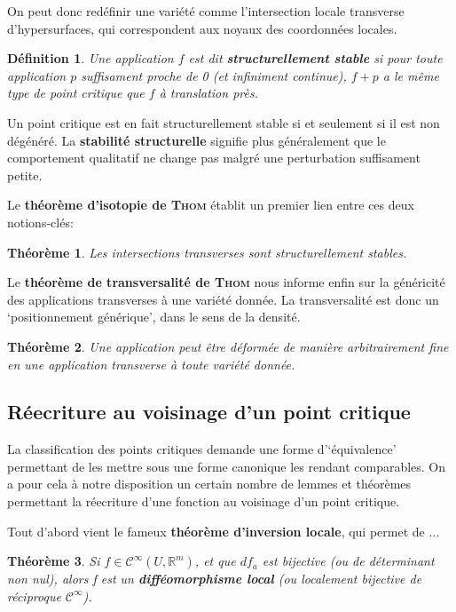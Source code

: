 \documentclass{article}
\newtheorem{defn}{Définition}
\newtheorem{thm}{Théorème}
\begin{document}
On peut donc redéfinir une variété comme l'intersection locale transverse d'hypersurfaces, qui correspondent aux noyaux des coordonnées locales.

\begin{defn}
Une application $f$ est dit \textbf{structurellement stable} si pour toute application $p$ suffisament proche de 0 (et infiniment continue), $f+p$ a le même type de point critique que $f$ à translation près.
\end{defn}

Un point critique est en fait structurellement stable si et seulement si il est non dégénéré.
La \textbf{stabilité structurelle} signifie plus généralement que le comportement qualitatif ne change pas malgré une perturbation suffisament petite.

Le \textbf{théorème d'isotopie de \textsc{Thom}} établit un premier lien entre ces deux notions-clés:

\begin{thm}
Les intersections transverses sont structurellement stables.
\end{thm}

Le \textbf{théorème de transversalité de \textsc{Thom}} nous informe enfin sur la généricité des applications transverses à une variété donnée.
La transversalité est donc un `positionnement générique', dans le sens de la densité.

\begin{thm}
Une application peut être déformée de manière arbitrairement fine en une application transverse à toute variété donnée.
\end{thm}

\subsection{Réecriture au voisinage d'un point critique}

La classification des points critiques demande une forme d'`équivalence' permettant de les mettre sous une forme canonique les rendant comparables.
On a pour cela à notre disposition un certain nombre de lemmes et théorèmes permettant la réecriture d'une fonction au voisinage d'un point critique.

Tout d'abord vient le fameux \textbf{théorème d'inversion locale}, qui permet de ...

\begin{thm}
Si $f\in\mathcal{C}^{\infty}(U,\mathbb{R}^m)$, et que $df_a$ est bijective (ou de déterminant non nul), alors f est un \textbf{difféomorphisme local} (ou localement bijective de réciproque $\mathcal{C}^{\infty}$).
\end{thm}
\end{document}
